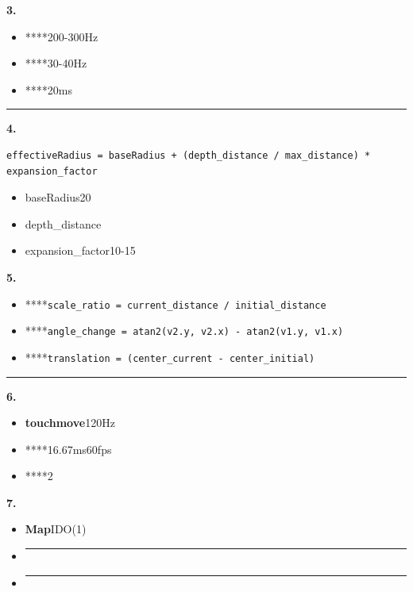 \textbf{3. }

\begin{itemize}
\tightlist
\item
  ****200-300Hz
\item
  ****30-40Hz
\item
  ****20ms
\end{itemize}

\begin{center}\rule{0.5\linewidth}{0.5pt}\end{center}

\textbf{4. }

\begin{verbatim}
effectiveRadius = baseRadius + (depth_distance / max_distance) * expansion_factor
\end{verbatim}

\begin{itemize}
\tightlist
\item
  baseRadius20
\item
  depth\_distance
\item
  expansion\_factor10-15
\end{itemize}

\textbf{5. }

\begin{itemize}
\tightlist
\item
  ****\texttt{scale\_ratio\ =\ current\_distance\ /\ initial\_distance}
\item
  ****\texttt{angle\_change\ =\ atan2(v2.y,\ v2.x)\ -\ atan2(v1.y,\ v1.x)}
\item
  ****\texttt{translation\ =\ (center\_current\ -\ center\_initial)}
\end{itemize}

\begin{center}\rule{0.5\linewidth}{0.5pt}\end{center}

\textbf{6. }

\begin{itemize}
\tightlist
\item
  \textbf{touchmove}120Hz
\item
  ****16.67ms60fps
\item
  ****2
\end{itemize}

\textbf{7. }

\begin{itemize}
\item
  \textbf{Map}IDO(1)
\item
  \begin{center}\rule{0.5\linewidth}{0.5pt}\end{center}
\item
  \begin{center}\rule{0.5\linewidth}{0.5pt}\end{center}
\end{itemize}


